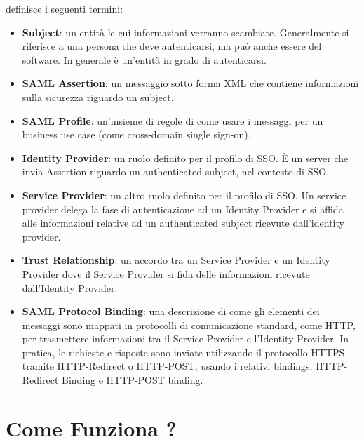 \saml{} definisce i seguenti termini:

\begin{itemize}
      \item \textbf{Subject}: un entità le cui informazioni verranno scambiate.
            Generalmente si riferisce a una persona che deve autenticarsi,
            ma può anche essere
            del software. In generale è un'entità in grado di autenticarsi.
      \item \textbf{SAML Assertion}: un messaggio sotto forma XML che contiene
            informazioni sulla sicurezza riguardo un subject.
      \item \textbf{SAML Profile}: un'insieme di regole di come usare i messaggi \saml{}
            per un business use case (come cross-domain single sign-on).
      \item \textbf{Identity Provider}: un ruolo definito per il profilo \saml{} di SSO.
            È un server che invia \saml{} Assertion riguardo un authenticated subject, nel
            contesto di SSO.
      \item \textbf{Service Provider}: un altro ruolo definito per il profilo \saml{} di
            SSO. Un service provider delega la fase di autenticazione ad un Identity
            Provider e si affida alle informazioni relative ad un authenticated
            subject ricevute dall'identity provider.
      \item \textbf{Trust Relationship}: un accordo tra un \saml{} Service Provider e un
            \saml{} Identity Provider dove il Service Provider si fida delle informazioni
            ricevute dall'Identity Provider.
      \item \textbf{SAML Protocol Binding}: una descrizione di come gli elementi
            dei messaggi \saml{} sono mappati in protocolli di comunicazione standard,
            come HTTP, per trasmettere informazioni tra il Service Provider e l'Identity
            Provider. In pratica, le richieste e risposte \saml{} sono inviate utilizzando
            il protocollo HTTPS tramite HTTP-Redirect o HTTP-POST, usando i relativi
            bindings, HTTP-Redirect Binding e HTTP-POST binding.
\end{itemize}

\section{Come Funziona ?}

